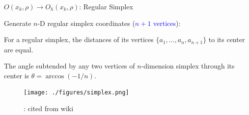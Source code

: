 \documentclass{beamer}
\begin{document}
\begin{frame}{$O(x_k, \rho)\rightarrow O_h(x_k, \rho)$: Regular Simplex}

\begin{itemize}
	\footnotesize{
	\item Generate $n$-D regular simplex coordinates
		(\textcolor{blue}{$n+1$ vertices}):
		}
	\begin{enumerate}
		\scriptsize{
		\item For a regular simplex, the distances of its vertices
			$\{a_1,\dots,a_n,a_{n+1}\}$ to its center are equal.
		\item The angle subtended by any two vertices of
			$n$-dimension simplex through its center is
			$\theta=\arccos(-1/n)$.  }
	\begin{figure}[!htbp]
		\centering
		  \texttt{[image: ./figures/simplex.png]}
		  \caption{: \scriptsize{cited from wiki}}
	\end{figure}
	\end{enumerate}
\end{itemize}
\end{frame}
\end{document}
